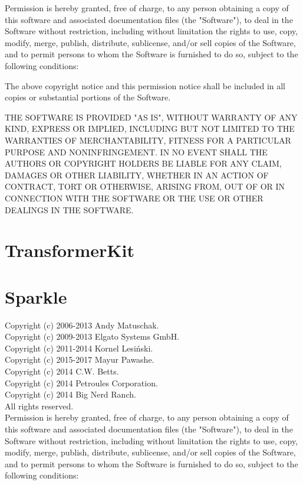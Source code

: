 \documentclass[parskip=half]{scrartcl}
\begin{document}
Permission is hereby granted, free of charge, to any person obtaining a copy of this software and associated documentation files (the "Software"), to deal in the Software without restriction, including without limitation the rights to use, copy, modify, merge, publish, distribute, sublicense, and/or sell copies of the Software, and to permit persons to whom the Software is furnished to do so, subject to the following conditions:

The above copyright notice and this permission notice shall be included in all copies or substantial portions of the Software.

THE SOFTWARE IS PROVIDED "AS IS", WITHOUT WARRANTY OF ANY KIND, EXPRESS OR IMPLIED, INCLUDING BUT NOT LIMITED TO THE WARRANTIES OF MERCHANTABILITY, FITNESS FOR A PARTICULAR PURPOSE AND NONINFRINGEMENT. IN NO EVENT SHALL THE AUTHORS OR COPYRIGHT HOLDERS BE LIABLE FOR ANY CLAIM, DAMAGES OR OTHER LIABILITY, WHETHER IN AN ACTION OF CONTRACT, TORT OR OTHERWISE, ARISING FROM, OUT OF OR IN CONNECTION WITH THE SOFTWARE OR THE USE OR OTHER DEALINGS IN THE SOFTWARE.
\section*{TransformerKit}
\section*{Sparkle}
Copyright (c) 2006-2013 Andy Matuschak.\\
Copyright (c) 2009-2013 Elgato Systems GmbH.\\
Copyright (c) 2011-2014 Kornel Lesiński.\\
Copyright (c) 2015-2017 Mayur Pawashe.\\
Copyright (c) 2014 C.W. Betts.\\
Copyright (c) 2014 Petroules Corporation.\\
Copyright (c) 2014 Big Nerd Ranch.\\
All rights reserved.\\

Permission is hereby granted, free of charge, to any person obtaining a copy of
this software and associated documentation files (the "Software"), to deal in
the Software without restriction, including without limitation the rights to
use, copy, modify, merge, publish, distribute, sublicense, and/or sell copies of
the Software, and to permit persons to whom the Software is furnished to do so,
subject to the following conditions:
\end{document}
